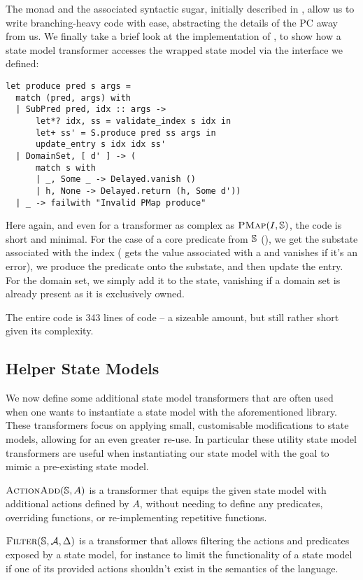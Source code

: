 The  monad and the associated syntactic sugar, initially described in \cite{sacha-phd}, allow us to write branching-heavy code with ease, abstracting the details of the PC away from us. We finally take a brief look at the implementation of \produce, to show how a state model transformer accesses the wrapped state model via the interface we defined: \begin{lstlisting}
let produce pred s args =
  match (pred, args) with
  | SubPred pred, idx :: args ->
      let*? idx, ss = validate_index s idx in
      let+ ss' = S.produce pred ss args in
      update_entry s idx idx ss'
  | DomainSet, [ d' ] -> (
      match s with
      | _, Some _ -> Delayed.vanish ()
      | h, None -> Delayed.return (h, Some d'))
  | _ -> failwith "Invalid PMap produce"
\end{lstlisting}
Here again, and even for a transformer as complex as $\textsc{PMap}(I,\mathbb S)$, the code is short and minimal. For the case of a core predicate from $\mathbb S$ (), we get the substate associated with the index ( gets the value associated with a  and vanishes if it's an error), we produce the predicate onto the substate, and then update the entry. For the domain set, we simply add it to the state, vanishing if a domain set is already present as it is exclusively owned.

The entire \PMap{} code is 343 lines of code -- a sizeable amount, but still rather short given its complexity.

\subsection{Helper State Models}

We now define some additional state model transformers that are often used when one wants to instantiate a state model with the aforementioned library. These transformers focus on applying small, customisable modifications to state models, allowing for an even greater re-use. In particular these utility state model transformers are useful when instantiating our state model with the goal to mimic a pre-existing state model.

$\textsc{ActionAdd}(\mathbb S, A)$ is a transformer that equips the given state model with additional actions defined by $A$, without needing to define any predicates, overriding functions, or re-implementing repetitive functions.

$\textsc{Filter}(\mathbb S, {\cal{A}}, \Delta)$ is a transformer that allows filtering the actions and predicates exposed by a state model, for instance to limit the functionality of a state model if one of its provided actions shouldn't exist in the semantics of the language.

